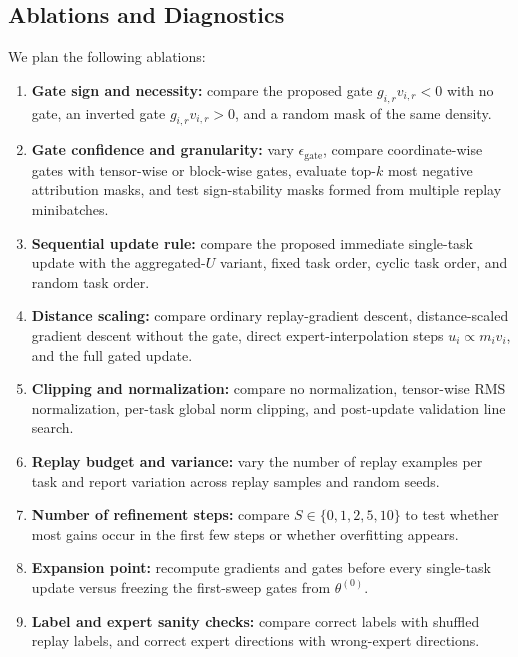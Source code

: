 \documentclass[11pt]{article}
\begin{document}
\subsection{Ablations and Diagnostics}
We plan the following ablations:
\begin{enumerate}[leftmargin=*]
    \item \textbf{Gate sign and necessity:} compare the proposed gate $g_{i,r}v_{i,r}<0$ with no gate, an inverted gate $g_{i,r}v_{i,r}>0$, and a random mask of the same density.
    \item \textbf{Gate confidence and granularity:} vary $\epsilon_{\mathrm{gate}}$, compare coordinate-wise gates with tensor-wise or block-wise gates, evaluate top-$k$ most negative attribution masks, and test sign-stability masks formed from multiple replay minibatches.
    \item \textbf{Sequential update rule:} compare the proposed immediate single-task update with the aggregated-$U$ variant, fixed task order, cyclic task order, and random task order.
    \item \textbf{Distance scaling:} compare ordinary replay-gradient descent, distance-scaled gradient descent without the gate, direct expert-interpolation steps $u_i\propto m_i v_i$, and the full gated update.
    \item \textbf{Clipping and normalization:} compare no normalization, tensor-wise RMS normalization, per-task global norm clipping, and post-update validation line search.
    \item \textbf{Replay budget and variance:} vary the number of replay examples per task and report variation across replay samples and random seeds.
    \item \textbf{Number of refinement steps:} compare $S\in\{0,1,2,5,10\}$ to test whether most gains occur in the first few steps or whether overfitting appears.
    \item \textbf{Expansion point:} recompute gradients and gates before every single-task update versus freezing the first-sweep gates from $\theta^{(0)}$.
    \item \textbf{Label and expert sanity checks:} compare correct labels with shuffled replay labels, and correct expert directions with wrong-expert directions.
\end{enumerate}
\end{document}
